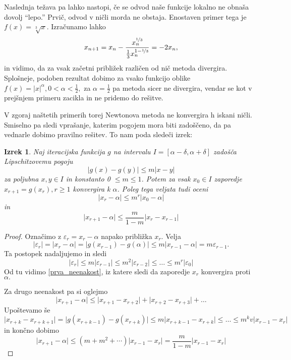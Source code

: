 \documentclass[12pt,a4paper]{amsart}
\theoremstyle{definition} %
\theoremstyle{plain} %
\newtheorem{izrek}[definicija]{Izrek}
\begin{document}
Naslednja težava pa lahko nastopi, če se odvod naše funkcije lokalno ne obnaša dovolj "`lepo."' Prvič, odvod v ničli morda ne obstaja. Enostaven primer tega je 
$f(x) = \sqrt[3]{x}.$ Izračunamo lahko
\[
    x_{n+1} = x_{n} - \frac{x_{n} ^ {\nicefrac{1}{3}}}{\frac{1}{3}x_{n}^{1 - \nicefrac{1}{3}}} = -2x_{n},
\]
in vidimo, da za vsak začetni približek različen od nič metoda divergira. Splošneje, podoben rezultat dobimo za vsako funkcijo oblike $f(x) = \lvert x \rvert^{\alpha}, 0 < \alpha < \frac{1}{2},$
za $\alpha = \frac{1}{2}$ pa metoda sicer ne divergira, vendar se kot v prejšnjem primeru zacikla in ne pridemo do rešitve.

V zgoraj naštetih primerih torej Newtonova metoda ne konvergira h iskani ničli. Smiselno pa sledi vprašanje, katerim pogojem mora biti zadoščeno, da pa 
vednarle dobimo pravilno rešitev. To nam poda sledeči izrek:
\begin{izrek} 
    Naj iteracijska funkcija $g$ na intervalu $I = [ \alpha - \delta,\alpha + \delta ]$ zadošča Lipschitzovemu pogoju
    \[
        \lvert g(x) - g(y) \rvert \leq m \lvert x - y \rvert
    \]
    za poljubna $x,y \in I$ in konstanto 0 $\leq m \leq 1$. Potem za vsak $x_{0} \in I$ zaporedje $x_{r+1} = g(x_{r}), r \geq 1$ konvergira k $\alpha$. Poleg tega veljata
    tudi oceni
    \begin{equation}\label{prva_neenakost}
        \lvert x_{r} - \alpha \rvert \leq m^{r}\lvert x_{0} - \alpha \rvert
    \end{equation}
    in
    \begin{equation}
        \lvert x_{r+1} - \alpha \rvert \leq \frac{m}{1-m} \lvert x_{r} - x_{r-1} \rvert
    \end{equation}
\end{izrek}
\begin{proof}
    Označimo z $\varepsilon_{r} = x_{r} - \alpha $ napako približka $x_{r}.$ Velja
    \[
        \lvert \varepsilon_{r} \rvert = \lvert x_{r} - \alpha \rvert = \lvert g(x_{r-1}) - g(\alpha) \rvert \leq m\lvert x_{r-1} - \alpha \rvert = m \varepsilon_{r-1}.
    \]
    Ta postopek nadaljujemo in sledi
    \[
        \lvert \varepsilon_{r} \rvert \leq m \lvert \varepsilon_{r-1} \rvert \leq m^{2} \lvert \varepsilon_{r-2} \rvert \leq \ldots \leq m^{r} \lvert\varepsilon_{0} \rvert
    \]
    Od tu vidimo \eqref{prva_neenakost}, iz katere sledi da zaporedje $x_{r}$ konvergira proti $\alpha.$

    Za drugo neenakost pa si oglejmo
    \[
        \lvert x_{r+1} - \alpha \rvert \leq \lvert x_{r+1} - x_{r+2} \rvert + \lvert x_{r+2} - x_{r+3} \rvert + \ldots
    \]
    Upoštevamo še
    \[
        \lvert x_{r+k} - x_{r+k+1} \rvert = \lvert g(x_{r+k-1}) - g(x_{r+k}) \rvert \leq m \lvert x_{r+k-1} - x_{r+k} \rvert \leq \ldots \leq m^{k}v\lvert x_{r-1} - x_{r}\rvert 
    \]
    in končno dobimo
    \[
        \lvert x_{r+1} - \alpha\rvert \leq (m + m^2 + \cdots)\lvert x_{r-1} - x_{r}\rvert = \frac{m}{1-m}\lvert x_{r-1} - x_{r}\rvert
    \]
\end{proof}
\end{document}
